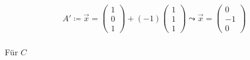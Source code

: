 \begin{gather}
A'\coloneqq \vec{x} = \begin{pmatrix}
1\\0\\1
\end{pmatrix}+(-1) \begin{pmatrix}
1\\1\\1
\end{pmatrix} 
\leadsto \vec{x} =
\begin{pmatrix}
0\\-1\\0
\end{pmatrix}
\end{gather}\\

Für \ensuremath{C}  %


